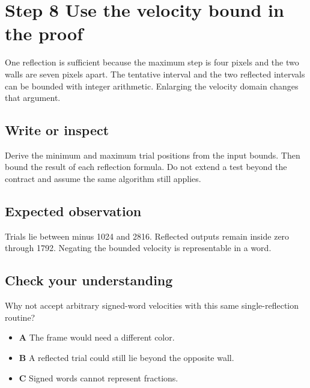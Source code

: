 \section{Step 8 Use the velocity bound in the proof}\label{ball-s08}

One reflection is sufficient because the maximum step is four pixels and the two walls are seven pixels apart. The tentative interval and the two reflected intervals can be bounded with integer arithmetic. Enlarging the velocity domain changes that argument.

\subsection{Write or inspect}
Derive the minimum and maximum trial positions from the input bounds. Then bound the result of each reflection formula. Do not extend a test beyond the contract and assume the same algorithm still applies.

\subsection{Expected observation}
Trials lie between minus 1024 and 2816. Reflected outputs remain inside zero through 1792. Negating the bounded velocity is representable in a word.

\subsection{Check your understanding}
Why not accept arbitrary signed-word velocities with this same single-reflection routine?

\begin{itemize}
  \item \textbf{A} The frame would need a different color.
  \item \textbf{B} A reflected trial could still lie beyond the opposite wall.
  \item \textbf{C} Signed words cannot represent fractions.
\end{itemize}
